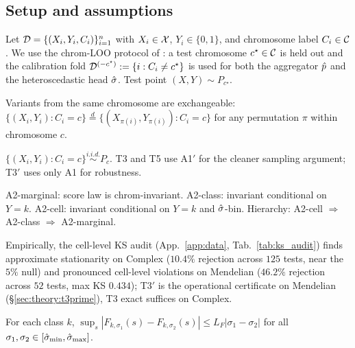 
\subsection{Setup and assumptions}
\label{sec:formulation:setup}

Let $\mathcal{D} = \{(X_i, Y_i, C_i)\}_{i=1}^n$ with $X_i \in \mathcal{X}$, $Y_i \in \{0, 1\}$, and chromosome label $C_i \in \mathcal{C}$. We use the chrom-LOO protocol of \citet{benegas2025traitgym}: a test chromosome $c^\star \in \mathcal{C}$ is held out and the calibration fold $\mathcal{D}^{(-c^\star)} := \{i : C_i \neq c^\star\}$ is used for both the aggregator $\hat{p}$ and the heteroscedastic head $\hat{\sigma}$. Test point $(X, Y) \sim P_{c^\star}$.

\begin{assumption}
\label{ass:A1}
Variants from the same chromosome are exchangeable: $\{(X_i, Y_i) : C_i = c\} \overset{d}{=} \{(X_{\pi(i)}, Y_{\pi(i)}) : C_i = c\}$ for any permutation $\pi$ within chromosome $c$.
\end{assumption}

\begin{assumption}
\label{ass:A1prime}
$\{(X_i, Y_i) : C_i = c\} \overset{i.i.d.}{\sim} P_c$. T3 and T5 use A1$'$ for the cleaner sampling argument; T3$'$ uses only A1 for robustness.
\end{assumption}

\begin{assumption}
\label{ass:A2}
A2-marginal: score law is chrom-invariant. A2-class: invariant conditional on $Y = k$. A2-cell: invariant conditional on $Y = k$ and $\hat{\sigma}$-bin. Hierarchy: A2-cell $\Rightarrow$ A2-class $\Rightarrow$ A2-marginal.
\end{assumption}

Empirically, the cell-level KS audit (App.~\ref{app:data}, Tab.~\ref{tab:ks_audit}) finds approximate stationarity on Complex ($10.4\%$ rejection across $125$ tests, near the $5\%$ null) and pronounced cell-level violations on Mendelian ($46.2\%$ rejection across $52$ tests, max KS $0.434$); T3$'$ is the operational certificate on Mendelian (§\ref{sec:theory:t3prime}), T3 exact suffices on Complex.

\begin{assumption}
\label{ass:ASL}
For each class $k$, $\sup_{s} |F_{k,\sigma_1}(s) - F_{k,\sigma_2}(s)| \leq L_F |\sigma_1 - \sigma_2|$ for all $\sigma_1, \sigma_2 \in [\hat{\sigma}_{\min}, \hat{\sigma}_{\max}]$.
\end{assumption}

